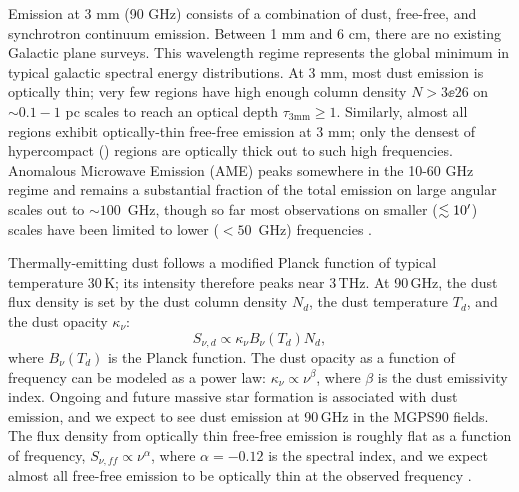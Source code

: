 \documentclass[twocolumn]{aastex62}
\def\todo#1{{\textcolor{red}{TODO: #1}}}
\begin{document}
Emission at 3 mm (90 GHz) consists of a combination of dust, free-free, and synchrotron continuum emission. 
Between 1 mm and 6 cm, there are no existing Galactic plane surveys.  This wavelength
regime represents the global minimum in typical galactic spectral energy
distributions.  At 3 mm, most dust emission is optically thin; very few regions
have high enough column density $N>3\ee{26}$ \persc on $\sim0.1-1$ pc scales to reach an optical
depth $\tau_{3 \mathrm{mm}}\geq1$.  Similarly, almost all \hii regions exhibit
optically-thin free-free emission  at 3 mm; only the densest of hypercompact
\hii (\hchii) regions are optically thick out to such high frequencies.
Anomalous Microwave Emission (AME) peaks somewhere in the 10-60 GHz
regime and remains a substantial fraction of the total emission on large angular scales out to
$\sim100$~GHz, though so far most observations on smaller ($\lesssim10\mbox{$^\prime$}$) scales have
been limited to lower ($<50$~GHz) frequencies  \citep{Dickinson2018a}.


Thermally-emitting dust follows a modified Planck function of typical temperature
30\,K; its intensity therefore peaks near 3\,THz.  At 90\,GHz, the dust flux
density is set by the dust column density $N_d$, the dust temperature $T_d$,
and the dust opacity $\kappa_\nu$:
\begin{equation}
    S_{\nu, d} \propto \kappa_\nu B_\nu(T_d) N_d,
    \label{eq:dust}
\end{equation}
where $B_\nu(T_d)$ is the Planck function.  The dust opacity as a function of
frequency can be modeled as a power law: $\kappa_\nu \propto \nu^{\beta}$,
where $\beta$ is the dust emissivity index.
Ongoing and future massive star formation is associated with dust emission, and
we expect to see dust emission at 90\,GHz in the MGPS90 fields.  
The flux density from optically thin free-free emission is roughly flat as a
function of frequency, $S_{\nu, ff} \propto \nu^{\alpha}$, where $\alpha=-0.12$
is the spectral index, and we expect almost
all free-free emission to be optically thin at the observed frequency
\citep{Wilson2009a,Condon2007a,Condon2016a}. 
\end{document}
